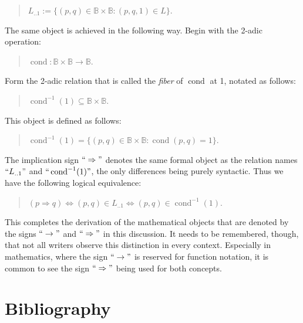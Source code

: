 \documentclass[12pt]{article}
\begin{document}
\begin{quote}
$L_{..1} := \{ (p, q) \in \mathbb{B} \times \mathbb{B} : (p, q, 1) \in L \}$.
\end{quote}

The same object is achieved in the following way.  Begin with the 2-adic operation:

\begin{quote}
$\operatorname{cond} : \mathbb{B} \times \mathbb{B} \to \mathbb{B}$.
\end{quote}

Form the 2-adic relation that is called the \textit{fiber} of $\operatorname{cond}$ at 1, notated as follows:

\begin{quote}
$\operatorname{cond}^{-1}(1) \subseteq \mathbb{B} \times \mathbb{B}$.
\end{quote}

This object is defined as follows:

\begin{quote}
$\operatorname{cond}^{-1}(1) = \{ (p, q) \in \mathbb{B} \times \mathbb{B} : \operatorname{cond}(p, q) = 1 \}$.
\end{quote}

The implication sign $``\Rightarrow"$ denotes the same formal object as the relation names $``L_{..1}"$ and $``\operatorname{cond}^{-1}(1)"$, the only differences being purely syntactic.  Thus we have the following logical equivalence:

\begin{quote}
$(p \Rightarrow q) \iff (p, q) \in L_{..1} \iff (p, q) \in \operatorname{cond}^{-1}(1)$.
\end{quote}

This completes the derivation of the mathematical objects that are denoted by the signs $``\rightarrow"$ and $``\Rightarrow"$ in this discussion.  It needs to be remembered, though, that not all writers observe this distinction in every context.  Especially in mathematics, where the sign $``\rightarrow"$ is reserved for function notation, it is common to see the sign $``\Rightarrow"$ being used for both concepts.

\section{Bibliography}
\end{document}
